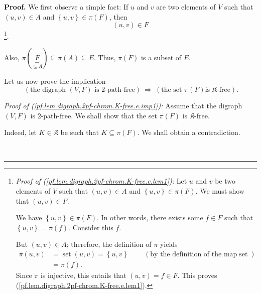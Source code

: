 \documentclass[numbers=enddot,12pt,final,onecolumn,notitlepage]{scrartcl}%
\theoremstyle{definition}
\newenvironment{proof}[1][Proof]{\noindent\textbf{#1.} }{\ \rule{0.5em}{0.5em}}
\newenvironment{verlong}{}{}
\begin{document}
\begin{verlong}
\begin{proof}
We first observe a simple fact: If $u$ and $v$ are two elements of $V$ such
that $\left(  u,v\right)  \in A$ and $\left\{  u,v\right\}  \in\pi\left(
F\right)  $, then%
\begin{equation}
\left(  u,v\right)  \in F \label{pf.lem.digraph.2pf-chrom.K-free.e.lem1}%
\end{equation}
\footnote{\textit{Proof of (\ref{pf.lem.digraph.2pf-chrom.K-free.e.lem1}):}
Let $u$ and $v$ be two elements of $V$ such that $\left(  u,v\right)  \in A$
and $\left\{  u,v\right\}  \in\pi\left(  F\right)  $. We must show that
$\left(  u,v\right)  \in F$.
\par
We have $\left\{  u,v\right\}  \in\pi\left(  F\right)  $. In other words,
there exists some $f\in F$ such that $\left\{  u,v\right\}  =\pi\left(
f\right)  $. Consider this $f$.
\par
But $\left(  u,v\right)  \in A$; therefore, the definition of $\pi$ yields%
\begin{align*}
\pi\left(  u,v\right)   &  =\operatorname*{set}\left(  u,v\right)  =\left\{
u,v\right\}  \ \ \ \ \ \ \ \ \ \ \left(  \text{by the definition of the map
}\operatorname*{set}\right) \\
&  =\pi\left(  f\right)  .
\end{align*}
Since $\pi$ is injective, this entails that $\left(  u,v\right)  =f\in F$.
This proves (\ref{pf.lem.digraph.2pf-chrom.K-free.e.lem1}).}.

Also, $\pi\left(  \underbrace{F}_{\subseteq A}\right)  \subseteq\pi\left(
A\right)  \subseteq E$. Thus, $\pi\left(  F\right)  $ is a subset of $E$.

Let us now prove the implication%
\begin{equation}
\ \left(  \text{the digraph }\left(  V,F\right)  \text{ is }2\text{-path-free}%
\right)  \ \Longrightarrow\ \left(  \text{the set }\pi\left(  F\right)  \text{
is }\mathfrak{K}\text{-free}\right)  .
\label{pf.lem.digraph.2pf-chrom.K-free.e.imp1}%
\end{equation}


\textit{Proof of (\ref{pf.lem.digraph.2pf-chrom.K-free.e.imp1}):} Assume that
the digraph $\left(  V,F\right)  $ is $2$-path-free. We shall show that the
set $\pi\left(  F\right)  $ is $\mathfrak{K}$-free.

Indeed, let $K\in\mathfrak{K}$ be such that $K\subseteq\pi\left(  F\right)  $.
We shall obtain a contradiction.


\end{proof}
\end{verlong}
\end{document}
